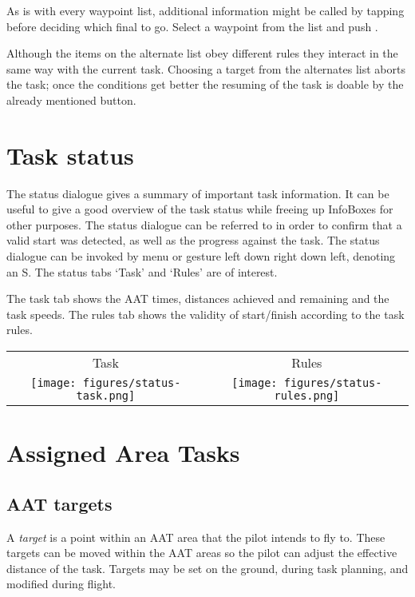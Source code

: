 As is with every waypoint list, additional information might be called by tapping  before deciding which final to go. Select a waypoint from the list and push .

Although the items on the alternate list obey different rules they interact
in the same way
with the current task. Choosing a target from the alternates list aborts the task;
once the conditions get better the resuming of the task is doable by the already
mentioned button.


\section{Task status}\label{sec:task-status}

The status dialogue gives a summary of important task information.
 It can be useful to give a
good overview of the task status while freeing up InfoBoxes for other
purposes.  The status dialogue can be referred to in order to confirm
that a valid start was detected, as well as the progress against the
task.
The status dialogue can be invoked by menu or gesture left down right down left, denoting an S. The status tabs `Task' and `Rules' are of interest.

The task tab shows the AAT times, distances achieved and remaining and the
task speeds. The rules tab shows the validity of start/finish according
to the task rules.
\begin{center}
\begin{tabular}{c c}
Task & Rules \\
\texttt{[image: figures/status-task.png]} &
\texttt{[image: figures/status-rules.png]} \\
\end{tabular}
\end{center}

\section{Assigned Area Tasks}\label{sec:aat-tasks}

\subsection*{AAT targets}

A {\em target} is a point within an AAT area that the pilot intends to
fly to.  These targets can be moved within the AAT areas so the pilot
can adjust the effective distance of the task.  Targets may be set on
the ground, during task planning, and modified during flight.


